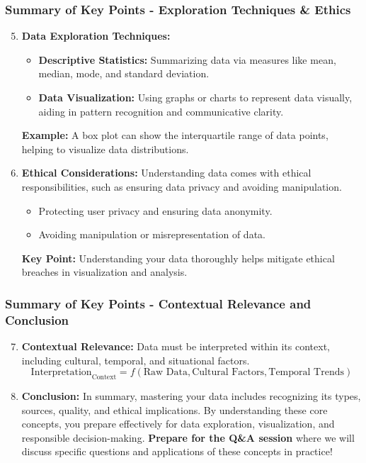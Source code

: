 \documentclass[aspectratio=169]{beamer}
\begin{document}
\begin{frame}[fragile]
    \frametitle{Summary of Key Points - Exploration Techniques & Ethics}
    \begin{enumerate}
        \setcounter{enumi}{4}  %
        \item \textbf{Data Exploration Techniques:}
            \begin{itemize}
                \item \textbf{Descriptive Statistics:} Summarizing data via measures like mean, median, mode, and standard deviation.
                \item \textbf{Data Visualization:} Using graphs or charts to represent data visually, aiding in pattern recognition and communicative clarity.
            \end{itemize}
            \pause
            \textbf{Example:} A box plot can show the interquartile range of data points, helping to visualize data distributions.

        \item \textbf{Ethical Considerations:}
            Understanding data comes with ethical responsibilities, such as ensuring data privacy and avoiding manipulation.
            \begin{itemize}
                \item Protecting user privacy and ensuring data anonymity.
                \item Avoiding manipulation or misrepresentation of data.
            \end{itemize}
            \pause
            \textbf{Key Point:} Understanding your data thoroughly helps mitigate ethical breaches in visualization and analysis.
    \end{enumerate}
\end{frame}

\begin{frame}[fragile]
    \frametitle{Summary of Key Points - Contextual Relevance and Conclusion}
    \begin{enumerate}
        \setcounter{enumi}{6}  %
        \item \textbf{Contextual Relevance:}
            Data must be interpreted within its context, including cultural, temporal, and situational factors.
            \begin{equation}
                \text{Interpretation}_{\text{Context}} = f(\text{Raw Data}, \text{Cultural Factors}, \text{Temporal Trends})
            \end{equation}

        \item \textbf{Conclusion:}
            In summary, mastering your data includes recognizing its types, sources, quality, and ethical implications. By understanding these core concepts, you prepare effectively for data exploration, visualization, and responsible decision-making. 
            \pause
            \textbf{Prepare for the Q\&A session} where we will discuss specific questions and applications of these concepts in practice!
    \end{enumerate}
\end{frame}
\end{document}
